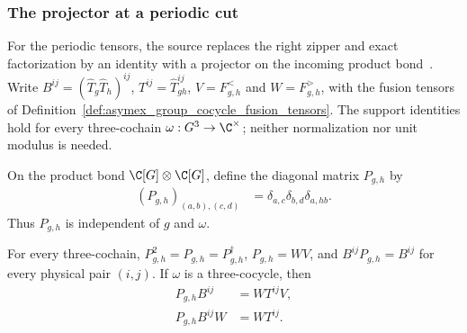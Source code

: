 
\subsubsection{The projector at a periodic cut}

For the periodic tensors, the source replaces the right zipper and exact
factorization by an identity with a projector on the incoming product
bond~\cite{GarreRubio2023MPOSym}. Write
$B^{ij}=(\hat T_g\hat T_h)^{ij}$,
$T^{ij}=\hat T_{gh}^{ij}$, $V=F^<_{g,h}$ and $W=F^>_{g,h}$, with the
fusion tensors of Definition~\ref{def:asymex_group_cocycle_fusion_tensors}.
The support identities hold for every three-cochain
$\omega:G^3\to\C^\times$; neither normalization nor unit modulus is needed.

\begin{definition}
    \label{def:asymex_pbc_projector}
    \leanok
    On the product bond $\C[G]\otimes\C[G]$, define the diagonal matrix
    $P_{g,h}$ by
    \begin{align}
        (P_{g,h})_{(a,b),(c,d)}
         & =\delta_{a,c}\delta_{b,d}\delta_{a,hb}.
        \label{eq:asymex_pbc_projector}
    \end{align}
    Thus $P_{g,h}$ is independent of $g$ and $\omega$.
\end{definition}

\begin{lemma}
    \label{thm:asymex_pbc_projected_zipper}
    \leanok
    For every three-cochain, $P_{g,h}^2=P_{g,h}=P_{g,h}^{\dagger}$,
    $P_{g,h}=WV$, and $B^{ij}P_{g,h}=B^{ij}$ for every physical pair $(i,j)$.
    If $\omega$ is a three-cocycle, then
    \begin{align}
        P_{g,h}B^{ij}  & =WT^{ij}V,
        \label{eq:asymex_pbc_factorization} \\
        P_{g,h}B^{ij}W & =WT^{ij}.
        \label{eq:asymex_pbc_zipper}
    \end{align}
\end{lemma}

